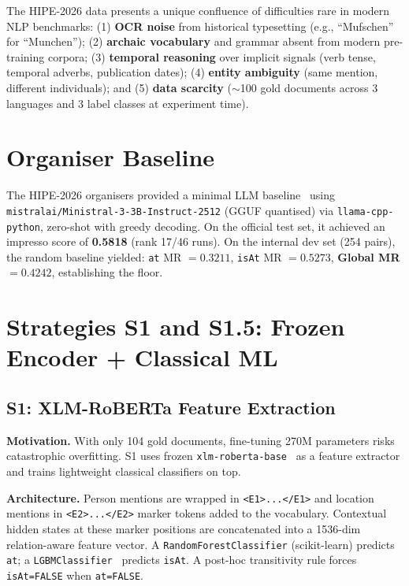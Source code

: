 \documentclass{ceurart}
\begin{document}
The HIPE-2026 data presents a unique confluence of difficulties rare in modern NLP benchmarks: (1) \textbf{OCR noise} from historical typesetting (e.g., ``Mufschen'' for ``Munchen''); (2) \textbf{archaic vocabulary} and grammar absent from modern pre-training corpora; (3) \textbf{temporal reasoning} over implicit signals (verb tense, temporal adverbs, publication dates); (4) \textbf{entity ambiguity} (same mention, different individuals); and (5) \textbf{data scarcity} ($\sim$100 gold documents across 3 languages and 3 label classes at experiment time).

\section{Organiser Baseline}
\label{sec:baseline}

The HIPE-2026 organisers provided a minimal LLM baseline~\cite{hipe2026baseline} using \texttt{mistralai/Ministral-3-3B-Instruct-2512} (GGUF quantised) via \texttt{llama-cpp-python}, zero-shot with greedy decoding. On the official test set, it achieved an impresso score of \textbf{0.5818} (rank 17/46 runs). On the internal dev set (254 pairs), the random baseline yielded: \texttt{at} MR $= 0.3211$, \texttt{isAt} MR $= 0.5273$, \textbf{Global MR $= 0.4242$}, establishing the floor.

\section{Strategies S1 and S1.5: Frozen Encoder + Classical ML}
\label{sec:s1}

\subsection{S1: XLM-RoBERTa Feature Extraction}

\textbf{Motivation.} With only 104 gold documents, fine-tuning 270M parameters risks catastrophic overfitting. S1 uses frozen \texttt{xlm-roberta-base}~\cite{conneau2020xlmr} as a feature extractor and trains lightweight classical classifiers on top.

\textbf{Architecture.} Person mentions are wrapped in \texttt{<E1>...</E1>} and location mentions in \texttt{<E2>...</E2>} marker tokens added to the vocabulary. Contextual hidden states at these marker positions are concatenated into a 1536-dim relation-aware feature vector. A \texttt{RandomForestClassifier} (scikit-learn) predicts \texttt{at}; a \texttt{LGBMClassifier}~\cite{ke2017lightgbm} predicts \texttt{isAt}. A post-hoc transitivity rule forces \texttt{isAt=FALSE} when \texttt{at=FALSE}.
\end{document}
